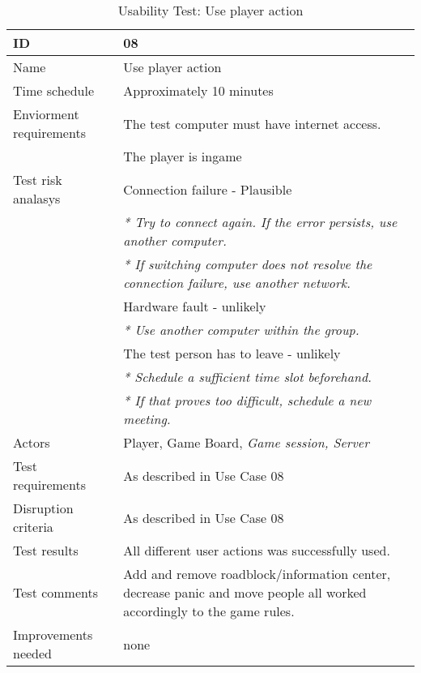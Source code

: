 {\footnotesize
\begin{table}[H]
\begin{tabular}{| p{5cm} | p{10cm} |}\hline
	\textbf{ID}	& \textbf{08} \\ \hline
	Name		& Use player action\\ \hline
	Time schedule	& Approximately 10 minutes\\ \hline
	Enviorment requirements 
		& The test computer must have internet access. \\ 
		& The player is ingame\\ \hline
	Test risk analasys 
		& Connection failure - Plausible \\
		& \emph{* Try to connect again. If the error persists, use another computer.} \\
		& \emph{* If switching computer does not resolve the connection failure, use another network.}\\
		& Hardware fault - unlikely \\
		& \emph{* Use another computer within the group.} \\
		& The test person has to leave - unlikely \\
		& \emph{* Schedule a sufficient time slot beforehand.} \\
		& \emph{* If that proves too difficult, schedule a new meeting.}\\ \hline
	Actors	& Player, Game Board, \emph{Game session, Server}\\ \hline
	Test requirements & As described in Use Case 08 \\ \hline
	Disruption criteria & As described in Use Case 08  \\ \hline
	Test results & All different user actions was successfully used.
		& \\ \hline
	Test comments & Add and remove roadblock/information center, decrease panic and move people all worked accordingly to the game rules.
		& \\ \hline
	Improvements needed & none
		& \\ \hline
\end{tabular}


\caption{Usability Test: Use player action}
\label{fig:usability_test_8}
\end{table}}






